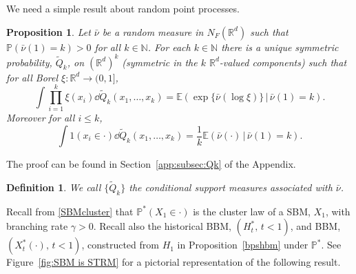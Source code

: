 \documentclass[12pt]{article}
\newtheorem{proposition}[theorem]{Proposition}
\numberwithin{theorem}{section}
\theoremstyle{def}
\newtheorem*{definition}{Definition}
\numberwithin{equation}{section}
\renewcommand{\P}{\mathbb{P}}
\newcommand{\E}{\mathbb{E}}
\newcommand{\R}{\mathbb{R}}
\newcommand{\N}{\mathbb{N}}
\newcommand{\SUBMIT}[1]{}
\newcommand{\ARXIV}[1]{#1}
\begin{document}
We need a simple result about random point processes.  
\begin{proposition}\label{Qk}
Let $\bar\nu$ be a random measure in $N_F(\R^d)$ such that $\P(\bar\nu(1)=k)>0$ for all $k\in\N$.  For each $k\in\N$ there is a unique symmetric probability, $\tilde Q_k$, on $(\R^d)^k$ (symmetric in the $k$ $\R^d$-valued components) such that for all Borel $\xi:\R^d\to(0,1]$,
\begin{equation*}
\int\prod_{i=1}^k\xi(x_i)\dd \tilde Q_k(x_1,\dots,x_k)=\E(\exp\{\bar\nu(\log\xi)\} \, | \, \bar\nu(1)=k).
\end{equation*}
Moreover for all $i\le k$, 
\begin{equation}\label{Qkmar}
\int 1(x_i\in\cdot)\dd \tilde Q_k(x_1,\dots,x_k)=\frac{1}{k}\E(\bar\nu(\cdot) \, | \, \bar\nu(1)=k).
\end{equation}
\end{proposition}
\ARXIV{The proof can be found in Section~\ref{app:subsec:Qk} of the Appendix.}
\SUBMIT{The proof of this result is elementary and left to the reader.}


\begin{definition} We call $\{\tilde Q_k\}$ the conditional support measures associated with $\bar\nu$. 
\end{definition} 

Recall from \eqref{SBMcluster} that $\P^*(X_1\in\cdot)$ is the cluster law of a SBM, $X_1$, with branching rate $\gamma>0$. %
Recall also the historical BBM, $(H^*_t, \,t<1)$, and BBM, $(X^*_t(\cdot), \,t<1)$, constructed from $H_1$ in Proposition~\ref{bpshbm} under $\P^*$. See Figure~\ref{fig:SBM is STRM} for a pictorial representation of the following result.
\end{document}
